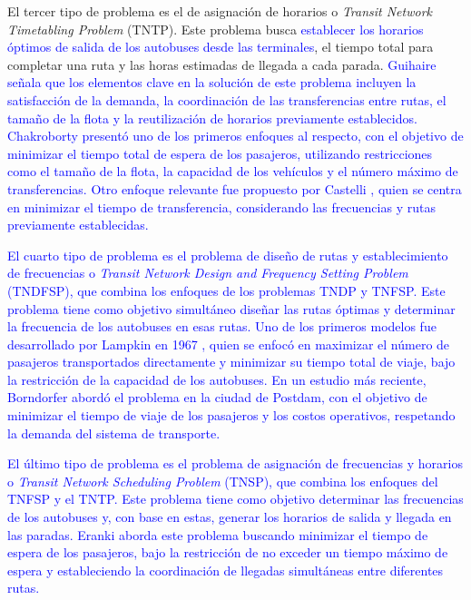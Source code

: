 \documentclass[preprint,11pt]{elsarticle}
\newcommand{\Blue}[1]{\textcolor{blue}{#1}}
\begin{document}
El tercer tipo de problema es el de asignación de horarios o \textit{Transit Network Timetabling Problem} (TNTP). Este problema busca \Blue{establecer los horarios óptimos de salida de los autobuses desde las terminales}, el tiempo total para completar una ruta y las horas estimadas de llegada a cada parada. \Blue{Guihaire \parencite{guihaire2008} señala que los elementos clave en la solución de este problema incluyen la satisfacción de la demanda, la coordinación de las transferencias entre rutas, el tamaño de la flota y la reutilización de horarios previamente establecidos. Chakroborty \parencite{chakroborty1995} presentó uno de los primeros enfoques al respecto, con el objetivo de minimizar el tiempo total de espera de los pasajeros, utilizando restricciones como el tamaño de la flota, la capacidad de los vehículos y el número máximo de transferencias. Otro enfoque relevante fue propuesto por Castelli \parencite{castelli2004}, quien se centra en minimizar el tiempo de transferencia, considerando las frecuencias y rutas previamente establecidas.}

\Blue{El cuarto tipo de problema es el problema de diseño de rutas y establecimiento de frecuencias o \textit{Transit Network Design and Frequency Setting Problem} (TNDFSP), que combina los enfoques de los problemas TNDP y TNFSP. Este problema tiene como objetivo simultáneo diseñar las rutas óptimas y determinar la frecuencia de los autobuses en esas rutas. Uno de los primeros modelos fue desarrollado por Lampkin en 1967 \parencite{lampkin1967}, quien se enfocó en maximizar el número de pasajeros transportados directamente y minimizar su tiempo total de viaje, bajo la restricción de la capacidad de los autobuses. En un estudio más reciente, Borndorfer \parencite{borndorfer2005} abordó el problema en la ciudad de Postdam, con el objetivo de minimizar el tiempo de viaje de los pasajeros y los costos operativos, respetando la demanda del sistema de transporte.}

\Blue{El último tipo de problema es el problema de asignación de frecuencias y horarios o \textit{Transit Network Scheduling Problem} (TNSP), que combina los enfoques del TNFSP y el TNTP. Este problema tiene como objetivo determinar las frecuencias de los autobuses y, con base en estas, generar los horarios de salida y llegada en las paradas. Eranki \parencite{eranki2004} aborda este problema buscando minimizar el tiempo de espera de los pasajeros, bajo la restricción de no exceder un tiempo máximo de espera y estableciendo la coordinación de llegadas simultáneas entre diferentes rutas.}
\end{document}
